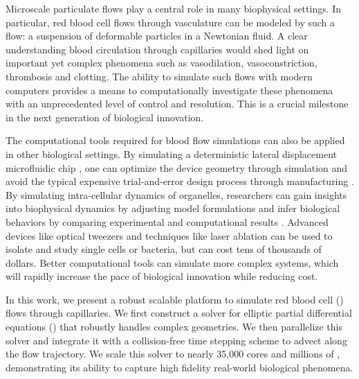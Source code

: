 
Microscale particulate flows play a central role in many biophysical settings.
In particular, red blood cell flows through vasculature can be modeled by such a flow: a suspension of deformable particles in a Newtonian fluid.
A clear understanding blood circulation through capillaries would shed light on important yet complex phenomena such as vasodilation, vasoconstriction, thrombosis and clotting.
The ability to simulate such flows with modern computers provides a means to computationally investigate these phenomena with an unprecedented level of control and resolution. 
This is a crucial milestone in the next generation of biological innovation.

The computational tools required for blood flow simulations can also be applied in other biological settings.
By simulating a deterministic lateral displacement microfluidic chip , one can optimize the device geometry through simulation and avoid the typical expensive trial-and-error design process through manufacturing \cite{kabacaouglu2019sorting}.
By simulating intra-cellular dynamics of organelles, researchers can gain insights into biophysical dynamics by adjusting model formulations and infer biological behaviors by comparing experimental and computational results \cite{nazockdast2017cytoplasmic}. 
Advanced devices like optical tweezers \cite{zhong2013trapping} and techniques like laser ablation \cite{yu2014measuring} can be used to isolate and study single cells or bacteria, but can cost tens of thousands of dollars.
Better computational tools can simulate more complex systems, which will rapidly increase the pace of biological innovation while reducing cost.

In this work, we present a robust scalable platform to simulate red blood cell (\rbc) flows through capillaries. 
We first construct a solver for elliptic partial differential equations (\pdes) that robustly handles complex geometries.
We then parallelize this solver and integrate it with a collision-free time stepping scheme to advect \rbcs along the flow trajectory.
We scale this solver to nearly 35,000 cores and millions of \rbcs, demonstrating its ability to capture high fidelity real-world biological phenomena.

